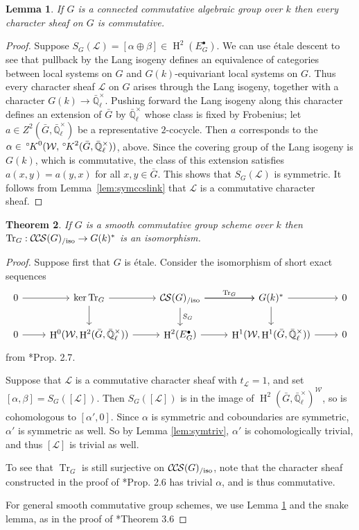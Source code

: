 \documentclass[10pt]{amsart}
\theoremstyle{plain}
\newtheorem{theorem}{Theorem}[section]
\newtheorem{lemma}[theorem]{Lemma}
\theoremstyle{definition}
\newcommand{\EE}{\mathbb{\bar Q}_\ell}
\newcommand{\Fq}{k}
\newcommand{\EEx}{\EE^\times}
\newcommand{\Weil}[1]{\mathcal{W}_{#1}}
\DeclareMathOperator{\Hh}{H}
\newcommand{\trFrob}[1]{t_{#1}}
\DeclareMathOperator{\Tr}{Tr}
\newcommand{\TrFrob}[1]{\Tr_{#1}}
\newcommand{\cs}[1]{{\mathcal{#1}}}
\newcommand{\CS}{{\mathcal{C\hskip-0.8pt S}}}
\newcommand{\CCS}{{\mathcal{C\hskip-.8pt C\hskip-0.8pt S}}}
\newcommand{\CSiso}[1]{\CS(#1)_{/\text{iso}}}
\newcommand{\CCSiso}[1]{\CCS(#1)_{/\text{iso}}}
\newcommand{\bG}{\bar{G}}
\newcommand{\oK}{{\,^\circ \hskip-1pt K}}
\begin{document}
\begin{lemma} \label{lem:conncomm}
If $G$ is a connected commutative algebraic group over $\Fq$ then every character sheaf on $G$ is commutative.
\end{lemma}

\begin{proof}
Suppose $S_G(\cs{L}) = [\alpha\oplus \beta]\in \Hh^2(E_G^\bullet)$.
We can use \'etale descent to see that pullback by the Lang isogeny defines an equivalence
of categories between local systems on $G$ and $G(\Fq)$-equivariant local systems on $G$.  
Thus every character sheaf $\cs{L}$ on $G$ arises through the Lang isogeny, together with a character $G(\Fq) \to \EEx$.
Pushing forward the Lang isogeny along this character defines an extension of $\bG$ by $\EEx$ whose class is fixed by Frobenius; let $a\in Z^2(\bG, \EEx)$ be a representative $2$-cocycle.
Then $a$ corresponds to the $\alpha \in \oK^0(\Weil{}, \oK^2(\bG, \EEx))$, above. 
Since the covering group of the Lang isogeny is $G(k)$, which is commutative, the class of this extension satisfies $a(x,y) = a(y,x)$ for all $x,y \in \bG$. 
This shows that $S_{G}(\cs{L})$ is symmetric.
It follows from Lemma~\ref{lem:symccslink} that $\cs{L}$ is a commutative character sheaf.
\end{proof}

\begin{theorem} \label{thm:trfrobiso}
If $G$ is a smooth commutative group scheme over $\Fq$ then $\TrFrob{G} : \CCSiso{G} \to G(\Fq)^*$ is an isomorphism.
\end{theorem}

\begin{proof}
Suppose first that $G$ is \'etale.  Consider the isomorphism of short exact sequences
\[
\begin{tikzcd}
 0 \arrow{r} & \ker \TrFrob{G} \arrow{d} \arrow{r} & \CSiso{G}\arrow{d}{S_G} \arrow{r}{\TrFrob{G}} \arrow{r} & G(\Fq)^* \arrow{d} \arrow{r} & 0\\
  0 \arrow{r} & \Hh^0(\Weil{},\Hh^2(\bG,\EEx)) \arrow{r} & \Hh^2(E^\bullet_G) \arrow{r} & \Hh^1(\Weil{},\Hh^1(\bG,\EEx)) \arrow{r} & 0
 \end{tikzcd}
 \]
from \cite{cunningham-roe:13a}*{Prop. 2.7}.

Suppose that $\cs{L}$ is a commutative character sheaf with $\trFrob{\cs{L}} = 1$, and set $[\alpha, \beta] = S_G([\cs{L}])$.
Then $S_G([\cs{L}])$ is in the image of $\Hh^2(\bG, \EEx)^\Weil{}$, so is cohomologous to
$[\alpha', 0]$.  Since $\alpha$ is symmetric and coboundaries are symmetric, $\alpha'$ is symmetric as well.
So by Lemma \ref{lem:symtriv}, $\alpha'$ is cohomologically trivial, and thus $[\cs{L}]$ is trivial as well.

To see that $\TrFrob{G}$ is still surjective on $\CCSiso{G}$, note that the character sheaf constructed in the proof of
\cite{cunningham-roe:13a}*{Prop. 2.6} has trivial $\alpha$, and is thus commutative.

For general smooth commutative group schemes, we use Lemma \ref{lem:conncomm} and the snake lemma, as in the proof of
\cite{cunningham-roe:13a}*{Theorem 3.6}
\end{proof}
\end{document}
